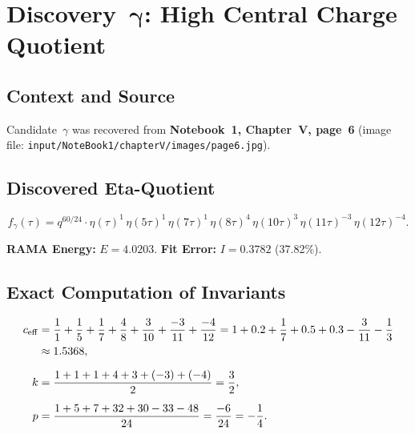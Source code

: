 \section{Discovery~$\boldsymbol{\gamma}$: High Central Charge Quotient}
\label{sec:candidate_gamma}

\subsection{Context and Source}

Candidate~$\gamma$ was recovered from \textbf{Notebook~1,
Chapter~V, page~6} (image file:
\texttt{input/NoteBook1/chapterV/images/page6.jpg}).

\subsection{Discovered Eta-Quotient}

\begin{equation}
  \label{eq:gamma_quotient}
  f_\gamma(\tau) = q^{60/24} \cdot
  \eta(\tau)^{1} \,
  \eta(5\tau)^{1} \,
  \eta(7\tau)^{1} \,
  \eta(8\tau)^{4} \,
  \eta(10\tau)^{3} \,
  \eta(11\tau)^{-3} \,
  \eta(12\tau)^{-4}.
\end{equation}

\textbf{RAMA Energy:} $E = 4.0203$. \quad
\textbf{Fit Error:} $I = 0.3782$ (37.82\%).

\subsection{Exact Computation of Invariants}

\begin{proposition}
\begin{align}
  c_{\mathrm{eff}} &= \frac{1}{1} + \frac{1}{5} + \frac{1}{7}
  + \frac{4}{8} + \frac{3}{10} + \frac{-3}{11}
  + \frac{-4}{12}
  = 1 + 0.2 + \frac{1}{7} + 0.5 + 0.3
  - \frac{3}{11} - \frac{1}{3} \notag\\
  &\approx 1.5368, \\[6pt]
  k &= \frac{1+1+1+4+3+(-3)+(-4)}{2} = \frac{3}{2}, \\[6pt]
  p &= \frac{1+5+7+32+30-33-48}{24} = \frac{-6}{24}
  = -\frac{1}{4}.
\end{align}
\end{proposition}

